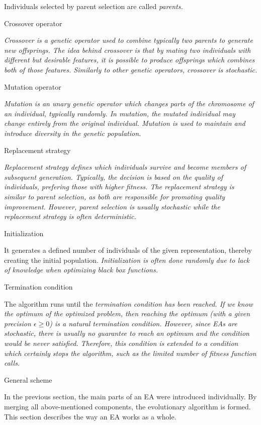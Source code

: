 Individuals selected by parent selection are called \em parents\em.

\secc Crossover operator

\em Crossover \em is a genetic operator used to combine typically two parents to
generate new offsprings. The idea behind crossover is that by mating two
individuals with different but desirable features, it is possible to produce offsprings
which combines both of those features. Similarly to other genetic operators, crossover is stochastic.

\secc Mutation operator

\em Mutation \em is an unary genetic operator which changes parts of the chromosome of an
individual, typically randomly. In mutation, the mutated individual may change entirely from
the original individual. Mutation is used to maintain and introduce diversity in the
genetic population.

\secc Replacement strategy

\em Replacement strategy \em defines which individuals survive and become members of
subsequent generation. Typically, the decision is based on the quality of individuals,
prefering those with higher fitness. The replacement strategy is similar to parent
selection, as both are responsible for promoting quality improvement. However,
parent selection is usually stochastic while the replacement strategy is often
deterministic.


\secc Initialization

It generates a defined number of individuals of the given representation, thereby
creating the initial population. \em Initialization \em is often done randomly
due to lack of knowledge when optimizing black box functions.


\secc Termination condition

The algorithm runs until the \em termination condition \em has been reached. If we
know the optimum of the optimized problem, then reaching the optimum (with a given
precision $\epsilon \geq  0$) is a natural termination condition. However, since EAs
are stochastic, there is usually no guarantee to reach an optimum and the condition
would be never satisfied. Therefore, this condition is extended to a condition which
certainly stops the algorithm, such as the limited number of fitness function calls.


\sec General scheme

In the previous section, the main parts of an EA were introduced individually.
By merging all above-mentioned components, the evolutionary algorithm is formed.
This section describes the way an EA works as a whole.

